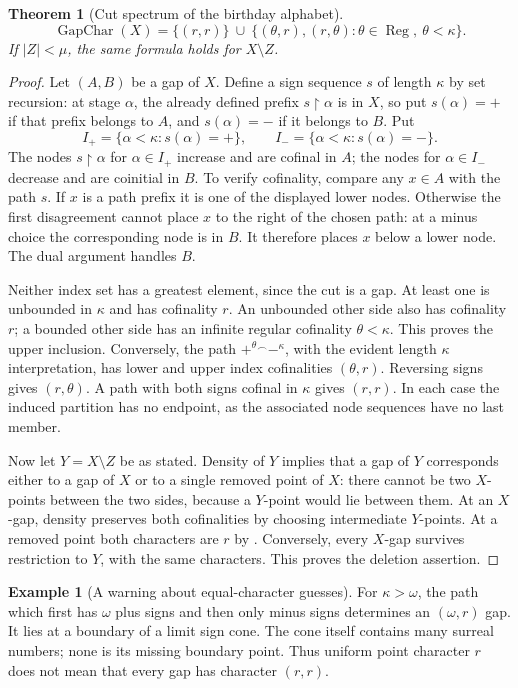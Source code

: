 \documentclass[11pt]{article}
\newtheorem{theorem}{Theorem}[section]
\theoremstyle{definition}
\newtheorem{example}[example]{Example}
\theoremstyle{remark}
\newcommand{\cat}{\mathbin{{}^\frown}}
\newcommand{\res}{\mathbin{\upharpoonright}}
\newcommand{\GapChar}{\operatorname{GapChar}}
\newcommand{\Reg}{\operatorname{Reg}}
\begin{document}
\begin{theorem}[Cut spectrum of the birthday alphabet]\label{swo:gs:thm:alphabet-gaps}
\[
 \GapChar(X)=\{(r,r)\}\ \cup\
 \{(\theta,r),(r,\theta):\theta\in\Reg,\ \theta<\kappa\}.
\]
If $|Z|<\mu$, the same formula holds for $X\setminus Z$.
\end{theorem}
\begin{proof}
Let $(A,B)$ be a gap of $X$. Define a sign sequence $s$ of length $\kappa$
by set recursion: at stage $\alpha$, the already defined prefix
$s\res\alpha$ is in $X$, so put $s(\alpha)=+$ if that prefix belongs to
$A$, and $s(\alpha)=-$ if it belongs to $B$. Put
\[
 I_+=\{\alpha<\kappa:s(\alpha)=+\},\qquad
 I_-=\{\alpha<\kappa:s(\alpha)=-\}.
\]
The nodes $s\res\alpha$ for $\alpha\in I_+$ increase and are cofinal in
$A$; the nodes for $\alpha\in I_-$ decrease and are coinitial in $B$.
To verify cofinality, compare any $x\in A$ with the path $s$. If $x$ is a
path prefix it is one of the displayed lower nodes. Otherwise the first
disagreement cannot place $x$ to the right of the chosen path: at a minus
choice the corresponding node is in $B$. It therefore places $x$ below a
lower node. The dual argument handles $B$.

Neither index set has a greatest element, since the cut is a gap. At
least one is unbounded in $\kappa$ and has cofinality $r$. An unbounded
other side also has cofinality $r$; a bounded other side has an infinite
regular cofinality $\theta<\kappa$. This proves the upper inclusion.
Conversely, the path $+^\theta\cat-^{\kappa}$, with the evident length
$\kappa$ interpretation, has lower and upper index cofinalities
$(\theta,r)$. Reversing signs gives $(r,\theta)$. A path with both signs
cofinal in $\kappa$ gives $(r,r)$. In each case the induced partition has
no endpoint, as the associated node sequences have no last member.

Now let $Y=X\setminus Z$ be as stated. Density of $Y$ implies that a gap
of $Y$ corresponds either to a gap of $X$ or to a single removed point of
$X$: there cannot be two $X$-points between the two sides, because a
$Y$-point would lie between them. At an $X$-gap, density preserves both
cofinalities by choosing intermediate $Y$-points. At a removed point both
characters are $r$ by \Cref{swo:gs:lem:alphabet-character}. Conversely, every
$X$-gap survives restriction to $Y$, with the same characters. This proves
the deletion assertion.
\end{proof}

\begin{example}[A warning about equal-character guesses]\label{swo:gs:n4.5}
For $\kappa>\omega$, the path which first has $\omega$ plus signs and then
only minus signs determines an $(\omega,r)$ gap. It lies at a boundary of
a limit sign cone. The cone itself contains many surreal numbers; none is
its missing boundary point. Thus uniform point character $r$ does not mean
that every gap has character $(r,r)$.
\end{example}
\end{document}
